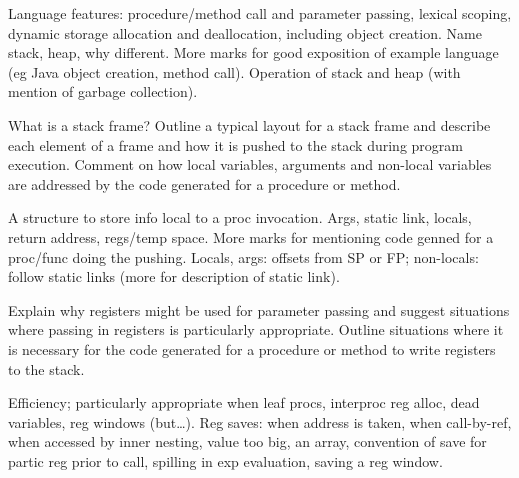 \documentclass[11pt]{cityexam}
\begin{document}
\begin{questions}
\begin{subquestions}
\begin{modelanswer}
Language features: procedure/method call and parameter passing,
lexical scoping, dynamic storage allocation and deallocation,
including object creation. Name stack, heap, why different.
More marks for good exposition of example language
(eg Java object creation, method call). Operation of
stack and heap (with mention of garbage collection).
\end{modelanswer}


\subquestion
What is a stack frame?
Outline a typical layout for a stack frame and describe 
each element of a frame and how it is pushed to the stack during
program execution. 
Comment on how local variables, arguments and non-local variables
are addressed by the code generated for a procedure or method. 

\begin{modelanswer}
A structure to store info local to a proc invocation.
Args, static link, locals, return address, regs/temp space.
More marks for mentioning code genned for a proc/func doing the
pushing.
Locals, args: offsets from SP or FP; non-locals: follow static links
(more for description of static link).
\end{modelanswer}

\subquestion
Explain why registers might be used for parameter passing and
suggest situations where passing in registers is particularly
appropriate. 
Outline situations where it is necessary for the code generated for a 
procedure or method to write registers to the stack.

\begin{modelanswer}
Efficiency; particularly appropriate when leaf procs, interproc
reg alloc, dead variables, reg windows (but\ldots).
Reg saves: when address is taken,
when call-by-ref,
when accessed by inner nesting,
value too big,
an array,
convention of save for partic reg prior to call,
spilling in exp evaluation,
saving a reg window.
\end{modelanswer}

\end{subquestions}


\end{questions}
\end{document}
